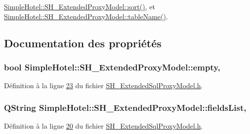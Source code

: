 \hyperlink{classSimpleHotel_1_1SH__ExtendedProxyModel_a5d7686a9fae295e0662057b8450c8a8d}{Simple\-Hotel\-::\-S\-H\-\_\-\-Extended\-Proxy\-Model\-::sort()}, et \hyperlink{classSimpleHotel_1_1SH__ExtendedProxyModel_a49617ea8bab745425beec3dbd3fddba7}{Simple\-Hotel\-::\-S\-H\-\_\-\-Extended\-Proxy\-Model\-::table\-Name()}.



\subsection{Documentation des propriétés}
\hypertarget{classSimpleHotel_1_1SH__ExtendedProxyModel_a45f47ab859c5443353977e22417de357}{
\subsubsection[{empty}]{\setlength{\rightskip}{0pt plus 5cm}bool Simple\-Hotel\-::\-S\-H\-\_\-\-Extended\-Proxy\-Model\-::empty\hspace{0.3cm}{\ttfamily [read]}, {\ttfamily [inherited]}}}\label{classSimpleHotel_1_1SH__ExtendedProxyModel_a45f47ab859c5443353977e22417de357}


Définition à la ligne \hyperlink{SH__ExtendedSqlProxyModel_8h_source_l00023}{23} du fichier \hyperlink{SH__ExtendedSqlProxyModel_8h_source}{S\-H\-\_\-\-Extended\-Sql\-Proxy\-Model.\-h}.

\hypertarget{classSimpleHotel_1_1SH__ExtendedProxyModel_a8872cff3d50bf25b1673ed2c951eeb4a}{
\subsubsection[{fields\-List}]{\setlength{\rightskip}{0pt plus 5cm}Q\-String Simple\-Hotel\-::\-S\-H\-\_\-\-Extended\-Proxy\-Model\-::fields\-List\hspace{0.3cm}{\ttfamily [read]}, {\ttfamily [inherited]}}}\label{classSimpleHotel_1_1SH__ExtendedProxyModel_a8872cff3d50bf25b1673ed2c951eeb4a}


Définition à la ligne \hyperlink{SH__ExtendedSqlProxyModel_8h_source_l00020}{20} du fichier \hyperlink{SH__ExtendedSqlProxyModel_8h_source}{S\-H\-\_\-\-Extended\-Sql\-Proxy\-Model.\-h}.

